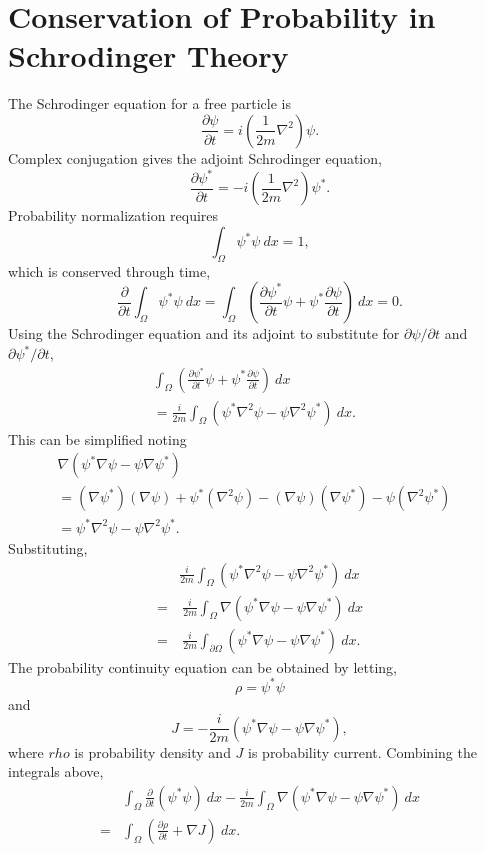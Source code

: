 \section{Conservation of Probability in Schrodinger Theory}
The Schrodinger equation for a free particle is
\[
\frac{\partial\psi}{\partial t} = i\left(\frac{1}{2m}\nabla^2\right)\psi.
\]
Complex conjugation gives the adjoint Schrodinger equation,
\[
\frac{\partial\psi^*}{\partial t} = -i\left(\frac{1}{2m}\nabla^2\right)\psi^*.
\]
Probability normalization requires
\[
\int_\Omega \psi^*\psi \: dx = 1,
\]
which is conserved through time,
\[
\frac{\partial}{\partial t} \int_\Omega \psi^*\psi \: dx = \int_\Omega \left(\frac{\partial \psi^*}{\partial t}\psi + \psi^*\frac{\partial \psi}{\partial t}\right) \: dx = 0.
\]
Using the Schrodinger equation and its adjoint to substitute for $\partial \psi /\partial t$ and $\partial \psi^* /\partial t$,
\begin{align*}
\int_\Omega \left(\frac{\partial \psi^*}{\partial t}\psi + \psi^*\frac{\partial \psi}{\partial t}\right) \: dx & \\
= \frac{i}{2m}\int_\Omega\left(\psi^*\nabla^2\psi - \psi\nabla^2\psi^*\right) \: dx.
\end{align*}
This can be simplified noting
\begin{align*}
\nabla\left(\psi^*\nabla\psi - \psi\nabla\psi^*\right) & \\
= \left(\nabla\psi^*\right)\left(\nabla\psi\right) + \psi^*\left(\nabla^2\psi\right) - \left(\nabla\psi\right)\left(\nabla\psi^*\right) - \psi\left(\nabla^2\psi^*\right) &\\
=\psi^*\nabla^2\psi - \psi\nabla^2\psi^*.
\end{align*}
Substituting,
\begin{align*}
&\frac{i}{2m}\int_\Omega\left(\psi^*\nabla^2\psi - \psi\nabla^2\psi^*\right) \: dx \\
=&\: \frac{i}{2m}\int_\Omega\nabla\left(\psi^*\nabla\psi - \psi\nabla\psi^*\right) \: dx \\
=&\: \frac{i}{2m}\int_{\partial\Omega}\left(\psi^*\nabla\psi - \psi\nabla\psi^*\right) \: dx.
\end{align*}
The probability continuity equation can be obtained by letting,
\[
\rho = \psi^*\psi
\]
and
\[
J=-\frac{i}{2m}\left(\psi^*\nabla\psi - \psi\nabla\psi^*\right),
\]
where $rho$ is probability density and $J$ is probability current. Combining the integrals above,
\begin{align*}
& \int_\Omega \frac{\partial}{\partial t}\left(\psi^*\psi\right) \: dx - \frac{i}{2m}\int_\Omega \nabla \left(\psi^*\nabla\psi - \psi\nabla\psi^*\right)\: dx \\ 
=& \int_\Omega \left(\frac{\partial \rho}{\partial t} + \nabla J\right) \: dx.
\end{align*}
